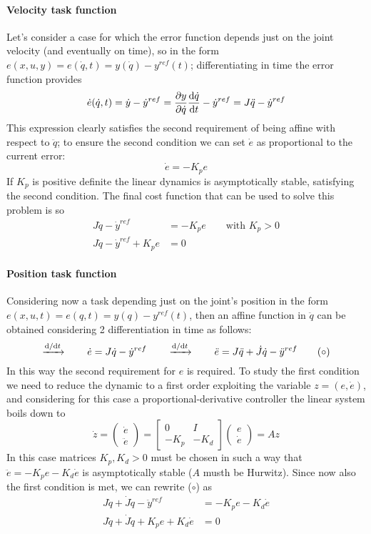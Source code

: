 	\paragraph{Velocity task function} Let's consider a case for which the error function depends just on the joint velocity (and eventually on time), so in the form $e(x,u,y) = e(\dot q, t) = y(\dot q) - y^{ref}(t)$; differentiating in time the error function provides
	\[ \dot e(\dot q, t) = \dot y - \dot y^{ref} = \frac{\partial y}{\partial \dot q} \frac{\mathrm{d} \dot q}{\mathrm{d} t} - \dot y^{ref} = J \ddot q - \dot y^{ref} \]
	This expression clearly satisfies the second requirement of being affine with respect to $\ddot q$; to ensure the second condition we can set $\dot e$ as proportional to the current error:
	\[ \dot e = -K_p e \]
	If $K_p$ is positive definite the linear dynamics is asymptotically stable, satisfying the second condition. The final cost function that can be used to solve this problem is so
	\begin{equation} 
	\begin{aligned} 
		J \ddot q - \dot y^{ref} & = - K_p e \qquad \textrm{with } K_p > 0 \\ 
		J\ddot q - \dot y^{ref} + K_p e & = 0
	\end{aligned}
	\end{equation}
	
	\paragraph{Position task function} Considering now a task depending just on the joint's position in the form $e(x,u,t) = e(q,t) = y(q) - y^{ref}(t)$, then an affine function in $\ddot q$ can be obtained considering 2 differentiation in time as follows:
	\[ \xrightarrow{\mathrm{d}/\mathrm{d} t} \qquad \dot e = J\dot q - \dot y^{ref} \qquad \xrightarrow{\mathrm{d}/\mathrm{d} t} \qquad \ddot e = J \ddot q + \dot J \dot q - \ddot y^{ref} \tag{$\circ$}  \]
	In this way the second requirement for $e$ is required. To study the first condition we need to reduce the dynamic to a first order exploiting the variable $z = (e,\dot e)$, and considering for this case a proportional-derivative controller the linear system boils down to
	\[ \dot z = \begin{pmatrix}
		\dot e \\ \ddot e
	\end{pmatrix} = \begin{bmatrix}
		0 & I \\ -K_p & - K_d
	\end{bmatrix} \begin{pmatrix}
		e \\ \dot e
	\end{pmatrix} = A z  \]
	In this case matrices $K_p,K_d > 0$ must be chosen in such a way that $\ddot e = -K_p e - K_d \dot e$ is asymptotically stable ($A$ musth be Hurwitz). Since now also the first condition is met, we can rewrite ($\circ$) as
	\begin{align*}
		J\ddot q + \dot J \dot q - \ddot y^{ref} & = - K_p e - K_d \dot e \\
		J\ddot q + \dot J \dot q + K_p e + K_d \dot e & = 0
	\end{align*}
	
